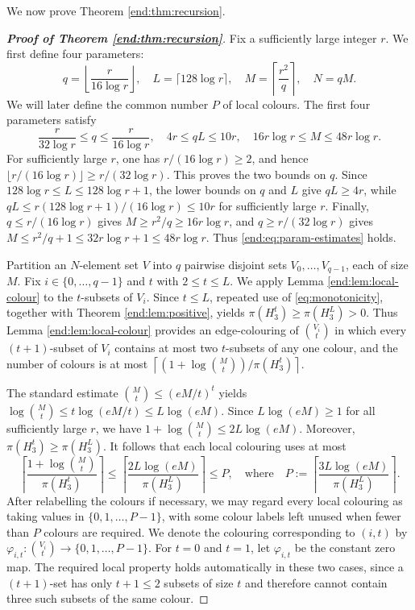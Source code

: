 \documentclass[10pt,a4paper]{amsart}
\numberwithin{equation}{section}
\begin{document}
\medskip
We now prove Theorem \ref{end:thm:recursion}.


\begin{proof}[\bfseries{Proof of Theorem \ref{end:thm:recursion}}]
Fix a sufficiently large integer $r$.  We first define four parameters:
$$ q=\left\lfloor\frac{r}{16\log r}\right\rfloor,
 \quad L=\lceil128\log r\rceil,
 \quad M=\left\lceil\frac{r^2}{q}\right\rceil,
 \quad N=qM.$$
We will later define the common number $P$ of local colours.  The first four parameters satisfy
\begin{equation}\label{end:eq:param-estimates}
 \frac{r}{32\log r}\le q\le\frac{r}{16\log r},
 \quad 4r\le qL\le10r,
 \quad 16r\log r\le M\le48r\log r.
\end{equation}
For sufficiently large $r$, one has $r/(16\log r)\ge2$, and hence $\lfloor r/(16\log r)\rfloor\ge r/(32\log r)$.  This proves the two bounds on $q$.  Since $128\log r\le L\le128\log r+1$, the lower bounds on $q$ and $L$ give $qL\ge4r$, while
$qL\le r(128\log r+1)/(16\log r)\le10r$ for sufficiently large $r$.  Finally, $q\le r/(16\log r)$ gives $M\ge r^2/q\ge16r\log r$, and $q\ge r/(32\log r)$ gives
$M\le r^2/q+1\le32r\log r+1\le48r\log r$.  
Thus \eqref{end:eq:param-estimates} holds.


Partition an $N$-element set $V$ into $q$ pairwise disjoint sets $V_0,\ldots,V_{q-1}$, each of size $M$.  Fix $i\in\{0,\ldots,q-1\}$ and $t$ with $2\le t\le L$.  
We apply Lemma \ref{end:lem:local-colour} to the $t$-subsets of $V_i$.  
Since $t\le L$, repeated use of \eqref{eq:monotonicity}, together with Theorem  \ref{end:lem:positive}, yields $\pi(H_3^t)\ge\pi(H_3^L)>0$.  
Thus Lemma \ref{end:lem:local-colour} provides an edge-colouring of $\binom{V_i}t$ in which every $(t+1)$-subset of $V_i$ contains at most two $t$-subsets of any one colour, and the number of colours is at most $\left\lceil(1+\log\binom Mt)/\pi(H_3^t)\right\rceil$.

The standard estimate $\binom Mt\le(eM/t)^t$ yields $\log\binom Mt\le t\log(eM/t)\le L\log(eM)$.  Since $L\log(eM)\ge1$ for all sufficiently large $r$, we have $1+\log\binom Mt\le2L\log(eM)$.  Moreover, $\pi(H_3^t)\ge\pi(H_3^L)$.  It follows that each local colouring uses at most
$$ \left\lceil\frac{1+\log\binom Mt}{\pi(H_3^t)}\right\rceil
 \le \left\lceil\frac{2L\log(eM)}{\pi(H_3^L)}\right\rceil
 \le P,
 \quad \text{where} \quad
 P:=\left\lceil\frac{3L\log(eM)}{\pi(H_3^L)}\right\rceil.$$
After relabelling the colours if necessary, we may regard every local colouring as taking values in $\{0,1,\ldots,P-1\}$, with some colour labels left unused when fewer than $P$ colours are required.  We denote the colouring corresponding to $(i,t)$ by
$\varphi_{i,t}:\binom{V_i}t\to\{0,1,\ldots,P-1\}$.
For $t=0$ and $t=1$, let $\varphi_{i,t}$ be the constant zero map.  The required local property holds automatically in these two cases, since a $(t+1)$-set has only $t+1\le2$ subsets of size $t$ and therefore cannot contain three such subsets of the same colour.



\end{proof}
\end{document}
